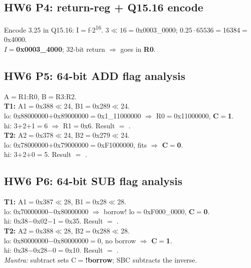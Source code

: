 \subsection{HW6 P4: return-reg + Q15.16 encode}
\begin{hwp}Encode 3.25 in Q15.16: I$=$f$\cdot$2\textsuperscript{16}. $3\!\ll\!16=$0x0003\_0000; $0.25\!\cdot\!65536=$16384$=$0x4000.\\
$I=$\textbf{0x0003\_4000}; 32-bit return $\Rightarrow$ goes in \textbf{R0}.\end{hwp}

\subsection{HW6 P5: 64-bit ADD flag analysis}
\begin{hwp}A$=$R1:R0, B$=$R3:R2.\\
\textbf{T1:} A1$=$0x388$\!\ll\!$24, B1$=$0x289$\!\ll\!$24.\\
lo: 0x88000000$+$0x89000000$=$0x1\_11000000 $\Rightarrow$ R0$=$0x11000000, \textbf{C$=$1}.\\
hi: 3$+$2$+$1$=$6 $\Rightarrow$ R1$=$0x6. Result $=$ .\\
\textbf{T2:} A2$=$0x378$\!\ll\!$24, B2$=$0x279$\!\ll\!$24.\\
lo: 0x78000000$+$0x79000000$=$0xF1000000, fits $\Rightarrow$ \textbf{C$=$0}.\\
hi: 3$+$2$+$0$=$5. Result $=$ .\end{hwp}

\subsection{HW6 P6: 64-bit SUB flag analysis}
\begin{hwp}\textbf{T1:} A1$=$0x387$\!\ll\!$28, B1$=$0x28$\!\ll\!$28.\\
lo: 0x70000000$-$0x80000000 $\Rightarrow$ borrow! lo$=$0xF000\_0000, \textbf{C$=$0}.\\
hi: 0x38$-$0x02$-$1$=$0x35. Result $=$ .\\
\textbf{T2:} A2$=$0x388$\!\ll\!$28, B2$=$0x288$\!\ll\!$28.\\
lo: 0x80000000$-$0x80000000$=$0, no borrow $\Rightarrow$ \textbf{C$=$1}.\\
hi: 0x38$-$0x28$-$0$=$0x10. Result $=$ .\\
\emph{Mantra:} subtract sets C$=$\textbf{!borrow}; SBC subtracts the inverse.\end{hwp}

